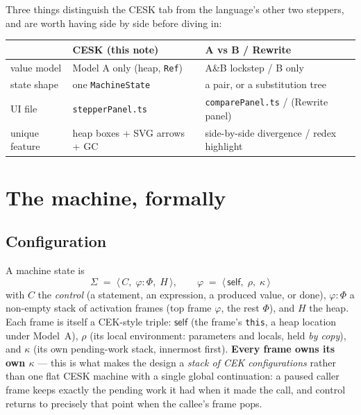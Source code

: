 \documentclass[11pt]{article}
\begin{document}
Three things distinguish the CESK tab from the language's other two
steppers, and are worth having side by side before diving in:

\begin{center}
\begin{tabular}{@{}lll@{}}
\toprule
 & \textbf{CESK (this note)} & \textbf{A vs B / Rewrite} \\
\midrule
value model & Model A only (heap, \texttt{Ref}) & A\&B lockstep / B only \\
state shape & one \texttt{MachineState} & a pair, or a substitution tree \\
UI file & \texttt{stepperPanel.ts} & \texttt{comparePanel.ts} / (Rewrite panel) \\
unique feature & heap boxes + SVG arrows + GC & side-by-side divergence / redex highlight \\
\bottomrule
\end{tabular}
\end{center}

\section{The machine, formally}
\label{sec:machine-formal}

\subsection{Configuration}

A machine state is
\[
  \Sigma \;=\; \langle\, C,\; \varphi\!:\!\Phi,\; H \,\rangle,
  \qquad
  \varphi \;=\; \langle\, \mathsf{self},\; \rho,\; \kappa \,\rangle
\]
with $C$ the \emph{control} (a statement, an expression, a produced value,
or done), $\varphi\!:\!\Phi$ a non-empty stack of activation frames (top
frame $\varphi$, the rest $\Phi$), and $H$ the heap. Each frame is itself a
CEK-style triple: $\mathsf{self}$ (the frame's \texttt{this}, a heap
location under Model~A), $\rho$ (its local environment: parameters and
locals, held \emph{by copy}), and $\kappa$ (its own pending-work stack,
innermost first). \textbf{Every frame owns its own $\kappa$} --- this is
what makes the design a \emph{stack of CEK configurations} rather than one
flat CESK machine with a single global continuation: a paused caller frame
keeps exactly the pending work it had when it made the call, and control
returns to precisely that point when the callee's frame pops.
\end{document}
